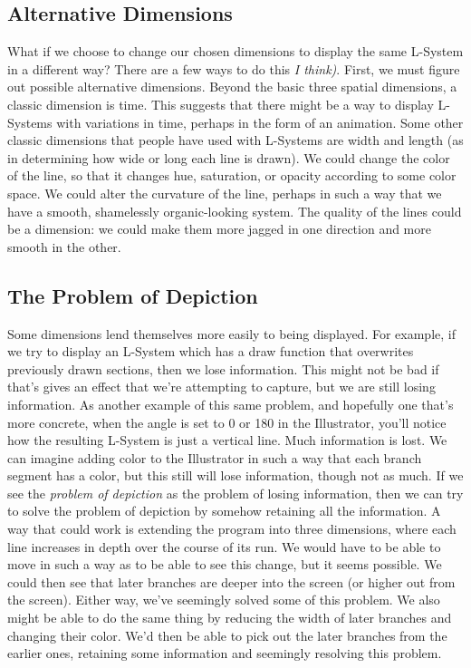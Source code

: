 \documentclass[12pt,twoside]{reedthesis}
\begin{document}
\subsection{Alternative Dimensions}
What if we choose to change our chosen dimensions to display the same L-System in a different way? There are a few ways to do this \textit{I think)}. First, we must figure out possible alternative dimensions. Beyond the basic three spatial dimensions, a classic dimension is time. This suggests that there might be a way to display L-Systems with variations in time, perhaps in the form of an animation. Some other classic dimensions that people have used with L-Systems are width and length (as in determining how wide or long each line is drawn). We could change the color of the line, so that it changes hue, saturation, or opacity according to some color space. We could alter the curvature of the line, perhaps in such a way that we have a smooth, shamelessly organic-looking system. The quality of the lines could be a dimension: we could make them more jagged in one direction and more smooth in the other.\\

\subsection{The Problem of Depiction}

	Some dimensions lend themselves more easily to being displayed. For example, if we try to display an L-System which has a draw function that overwrites previously drawn sections, then we lose information. This might not be bad if that's gives an effect that we're attempting to capture, but we are still losing information. As another example of this same problem, and hopefully one that's more concrete, when the angle is set to 0 or 180 in the Illustrator, you'll notice how the resulting L-System is just a vertical line. Much information is lost. We can imagine adding color to the Illustrator in such a way that each branch segment has a color, but this still will lose information, though not as much. If we see the \textit{problem of depiction} as the problem of losing information, then we can try to solve the problem of depiction by somehow retaining all the information. A way that could work is extending the program into three dimensions, where each line increases in depth over the course of its run. We would have to be able to move in such a way as to be able to see this change, but it seems possible. We could then see that later branches are deeper into the screen (or higher out from the screen). Either way, we've seemingly solved some of this problem. We also might be able to do the same thing by reducing the width of later branches and changing their color. We'd then be able to pick out the later branches from the earlier ones, retaining some information and seemingly resolving this problem.\\
\end{document}
